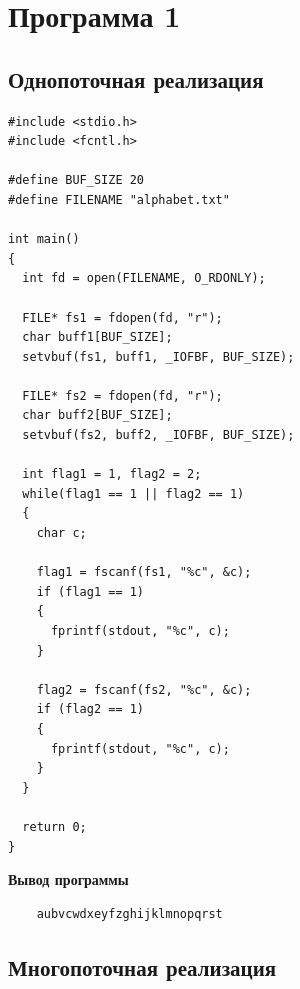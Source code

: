 \chapter{Программа 1} 

\section{Однопоточная реализация}

\begin{lstlisting}[caption={\text{Программа №1}}]
#include <stdio.h>
#include <fcntl.h>

#define BUF_SIZE 20
#define FILENAME "alphabet.txt"

int main()
{
  int fd = open(FILENAME, O_RDONLY);

  FILE* fs1 = fdopen(fd, "r");
  char buff1[BUF_SIZE];
  setvbuf(fs1, buff1, _IOFBF, BUF_SIZE);

  FILE* fs2 = fdopen(fd, "r");
  char buff2[BUF_SIZE];
  setvbuf(fs2, buff2, _IOFBF, BUF_SIZE);

  int flag1 = 1, flag2 = 2;
  while(flag1 == 1 || flag2 == 1)
  {
    char c;

    flag1 = fscanf(fs1, "%c", &c);
    if (flag1 == 1)
    {
      fprintf(stdout, "%c", c);     
    }

    flag2 = fscanf(fs2, "%c", &c);
    if (flag2 == 1)
    {
      fprintf(stdout, "%c", c); 
    }
  }

  return 0;
}
\end{lstlisting}

\textbf{Вывод программы}

\begin{lstlisting}
	aubvcwdxeyfzghijklmnopqrst
\end{lstlisting}

\section{Многопоточная реализация}

